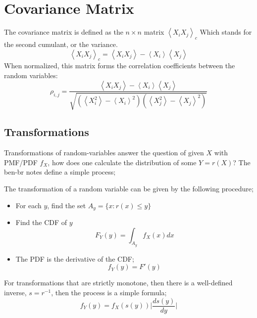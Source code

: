 \section{Covariance Matrix}
The covariance matrix is defined as the $n \times n$ matrix $\left \langle X_i X_j\right \rangle_c$ Which stands for the second cumulant, or the variance.
\begin{equation}
	\left \langle X_i X_j\right \rangle_c = \left \langle X_i X_j\right \rangle - \left \langle X_i\right \rangle\left \langle X_j\right \rangle
\end{equation}
When normalized, this matrix forms the correlation coefficients between the random variables:
\begin{equation}
	\rho_{i,j} = \frac{ \left \langle X_i X_j\right \rangle - \left \langle X_i\right \rangle\left \langle X_j\right \rangle}{\sqrt{( \left \langle X_i^2\right \rangle - \left \langle X_i\right \rangle^2)( \left \langle X_j^2\right \rangle - \left \langle X_j\right \rangle^2)}}
\end{equation}
\subsection{Transformations}
Transformations of random-variables answer the question of given $X$ with PMF/PDF $f_X$, how does one calculate the distribution of some $Y = r(X)$? The ben-br notes define a simple process;
\begin{theorem}
	The transformation of a random variable can be given by the following procedure;
	\begin{itemize}
		\item For each $y$, find the set $A_y = \{x : r(x) \leq y\}$
		\item Find the CDF of $y$ 
		\begin{equation}
			F_Y(y) = \int_{A_y}f_X(x) dx	
		\end{equation}
		\item The PDF is the derivative of the CDF;
		\begin{equation}
			f_Y(y) = F'(y)
		\end{equation}
	\end{itemize}
\end{theorem}

For transformations that are strictly monotone, then there is a well-defined inverse, $s = r^{-1}$, then the process is a simple formula;
\begin{equation}
	f_Y(y) = f_X(s(y))\Bigg| \frac{ds(y)}{dy}\Bigg|
\end{equation}

